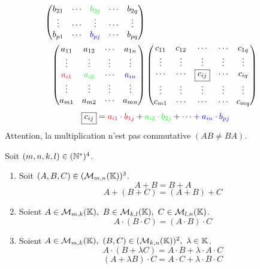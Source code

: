 \begin{definition}
\begin{enumerate}
\begin{align*}
\begin{pmatrix}
                b_{21} & \cdots & \color{green}b_{2j} & \cdots & b_{2q} \\
                \vdots & \cdots & \vdots & \cdots & \vdots \\
                b_{p1} & \cdots & \color{blue}b_{pj} & \cdots & b_{pq}
            \end{pmatrix}
            \\
            \begin{pmatrix}
                a_{11} & a_{12} & \cdots & a_{1n} \\ 
                \vdots & \vdots & \vdots & \vdots \\
                \color{red}a_{i1} & \color{green}a_{i2} & \cdots & \color{blue}a_{in} \\ 
                \vdots & \vdots & \vdots & \vdots \\
                a_{m1} & a_{m2} & \cdots & a_{mn}
            \end{pmatrix}
            &\begin{pmatrix}
                c_{11} & c_{12} & \cdots & \cdots & c_{1q} \\
                \vdots & \vdots & \vdots & \vdots & \vdots \\
                \cdots & \cdots & \boxed{c_{ij}} & \cdots & c_{iq} \\
                \vdots & \vdots & \vdots & \vdots & \vdots \\
                c_{m1} & \cdots & \cdots & \cdots & c_{mq}
            \end{pmatrix}
        \end{align*}
        \[ \boxed{c_{ij}} = \color{red}a_{i1} \cdot b_{1j} \color{black}+ \color{green} a_{i2} \cdot b_{2j} \color{black}+ \color{blue}\cdots + a_{in} \cdot b_{pj} \]
		Attention, la multiplication n'est pas commutative $(AB \neq BA)$.
	\end{enumerate}
\end{definition}

\begin{proposition}
	Soit $(m, n, k, l) \in (\mathbb{N}^*)^4$.
	\begin{enumerate}
		\item Soit $(A, B, C) \in (\mathcal{M}_{m,n} (\mathbb{K}))^3$.
		\[A + B = B + A\]
		\[A + (B + C) = (A + B) + C\]
		\item Soient $A \in \mathcal{M}_{m, k}(\K),\ B \in \mathcal{M}_{k, l}(\K),\ C \in \mathcal{M}_{l, n}(\K)$.
		\[A \cdot (B \cdot C) = (A \cdot B) \cdot C\]
		\item Soient $A \in \mathcal{M}_{m, k}(\K),\ (B, C) \in (\mathcal{M}_{k, n}(\K))^2,\ \lambda \in \K$.
		\[A \cdot (B + \lambda C) = A \cdot B + \lambda \cdot A \cdot C\]
		\[(A + \lambda B) \cdot C = A \cdot C + \lambda \cdot B \cdot C\]
	\end{enumerate}
\end{proposition}

